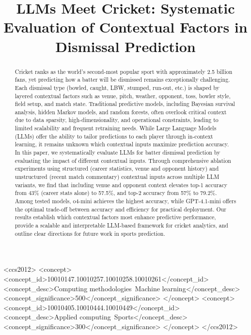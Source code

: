 \documentclass[sigconf,anonymous,review]{acmart}
\begin{document}
\raggedbottom


\title{LLMs Meet Cricket: Systematic Evaluation of Contextual Factors in Dismissal Prediction}


\begin{abstract}
Cricket ranks as the world's second-most popular sport with approximately 2.5 billion fans, yet predicting how a batter will be dismissed remains exceptionally challenging. Each dismissal type (bowled, caught, LBW, stumped, run‑out, etc.) is shaped by layered contextual factors such as venue, pitch, weather, opponent, toss, bowler style, field setup, and match state. Traditional predictive models, including Bayesian survival analysis, hidden Markov models, and random forests, often overlook critical context due to data sparsity, high-dimensionality, and operational constraints, leading to limited scalability and frequent retraining needs. While Large Language Models (LLMs) offer the ability to tailor predictions to each player through in-context learning, it remains unknown which contextual inputs maximize prediction accuracy. In this paper, we systematically evaluate LLMs for batter dismissal prediction by evaluating the impact of different contextual inputs. Through comprehensive ablation experiments using structured (career statistics, venue and opponent history) and unstructured (recent match commentary) contextual inputs across multiple LLM variants, we find that including venue and opponent context elevates top-1 accuracy from 43\% (career stats alone) to 57.5\%, and top-2 accuracy from 57\% to 79.2\%. Among tested models, o4-mini achieves the highest accuracy, while GPT-4.1-mini offers the optimal trade-off between accuracy and efficiency for practical deployment. Our results establish which contextual factors most enhance predictive performance, provide a scalable and interpretable LLM-based framework for cricket analytics, and outline clear directions for future work in sports prediction.
\end{abstract}

\begin{CCSXML}
<ccs2012>
   <concept>
      <concept_id>10010147.10010257.10010258.10010261</concept_id>
      <concept_desc>Computing methodologies~Machine learning</concept_desc>
      <concept_significance>500</concept_significance>
   </concept>
   <concept>
      <concept_id>10010405.10010444.10010449</concept_id>
      <concept_desc>Applied computing~Sports</concept_desc>
      <concept_significance>300</concept_significance>
   </concept>
</ccs2012>
\end{CCSXML}
\end{document}
